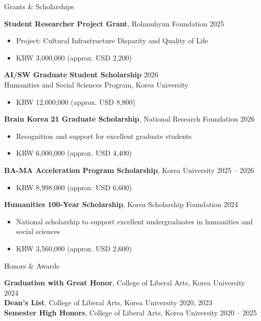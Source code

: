\documentclass{resume} %
\begin{document}
\begin{rSection}{Grants \& Scholarships}

{\bf Student Researcher Project Grant}{, Rohmuhyun Foundation} \hfill {2025}
\begin{itemize}
  \item Project: Cultural Infrastructure Disparity and Quality of Life
  \item KRW 3,000,000 (approx. USD 2,200)
\end{itemize}
\smallskip
{\bf AI/SW Graduate Student Scholarship} \hfill {2026}
\\ Humanities and Social Sciences Program, Korea University
\begin{itemize}
  \item KRW 12,000,000 (approx. USD 8,800)
\end{itemize}
\smallskip
{\bf Brain Korea 21 Graduate Scholarship}{, National Research Foundation} \hfill {2026}
\begin{itemize}
  \item Recognition and support for excellent graduate students
  \item KRW 6,000,000 (approx. USD 4,400)
\end{itemize}
\smallskip
{\bf BA-MA Acceleration Program Scholarship}{, Korea University} \hfill {2025 -- 2026}
\begin{itemize}
  \item KRW 8,998,000 (approx. USD 6,600)
\end{itemize}
\smallskip
{\bf Humanities 100-Year Scholarship}{, Korea Scholarship Foundation} \hfill {2024}
\begin{itemize}
  \item National scholarship to support excellent undergraduates in humanities and social sciences
  \item KRW 3,560,000 (approx. USD 2,600)
\end{itemize}

\end{rSection}


\begin{rSection}{Honors \& Awards}

{\bf Graduation with Great Honor}{, College of Liberal Arts, Korea University} \hfill {2024}
\\ {\bf Dean's List}{, College of Liberal Arts, Korea University} \hfill {2020, 2023}
\\ {\bf Semester High Honors}{, College of Liberal Arts, Korea University} \hfill {2020 -- 2025}

\end{rSection}
\end{document}
